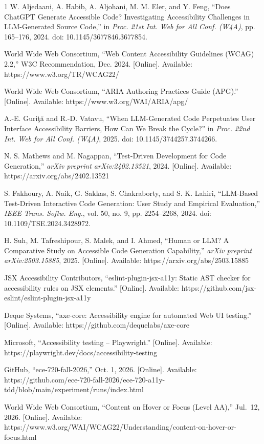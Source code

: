 \documentclass[conference]{IEEEtran}
\begin{document}
\begin{thebibliography}{1}
W. Aljedaani, A. Habib, A. Aljohani, M. M. Eler,
and Y. Feng,
``Does ChatGPT Generate Accessible Code?
Investigating Accessibility Challenges in
LLM-Generated Source Code,''
in \emph{Proc. 21st Int. Web for All Conf. (W4A)},
pp. 165--176, 2024.
doi: 10.1145/3677846.3677854.

World Wide Web Consortium,
``Web Content Accessibility Guidelines (WCAG) 2.2,''
W3C Recommendation, Dec. 2024.
[Online]. Available:
https://www.w3.org/TR/WCAG22/

World Wide Web Consortium,
``ARIA Authoring Practices Guide (APG).''
[Online]. Available:
https://www.w3.org/WAI/ARIA/apg/

A.-E. Guri{\c{t}}{\u{a}} and R.-D. Vatavu,
``When LLM-Generated Code Perpetuates User
Interface Accessibility Barriers, How Can We
Break the Cycle?''
in \emph{Proc. 22nd Int. Web for All Conf. (W4A)},
2025.
doi: 10.1145/3744257.3744266.

N. S. Mathews and M. Nagappan,
``Test-Driven Development for Code Generation,''
\emph{arXiv preprint arXiv:2402.13521}, 2024.
[Online]. Available:
https://arxiv.org/abs/2402.13521

S. Fakhoury, A. Naik, G. Sakkas,
S. Chakraborty, and S. K. Lahiri,
``LLM-Based Test-Driven Interactive Code
Generation: User Study and Empirical Evaluation,''
\emph{IEEE Trans. Softw. Eng.},
vol. 50, no. 9, pp. 2254--2268, 2024.
doi: 10.1109/TSE.2024.3428972.

H. Suh, M. Tafreshipour, S. Malek, and I. Ahmed,
``Human or LLM? A Comparative Study on
Accessible Code Generation Capability,''
\emph{arXiv preprint arXiv:2503.15885}, 2025.
[Online]. Available:
https://arxiv.org/abs/2503.15885

JSX Accessibility Contributors,
``eslint-plugin-jsx-a11y: Static AST checker
for accessibility rules on JSX elements.''
[Online]. Available:
https://github.com/jsx-eslint/eslint-plugin-jsx-a11y

Deque Systems,
``axe-core: Accessibility engine for automated
Web UI testing.''
[Online]. Available:
https://github.com/dequelabs/axe-core

Microsoft,
``Accessibility testing -- Playwright.''
[Online]. Available:
https://playwright.dev/docs/accessibility-testing

  GitHub, ``ece-720-fall-2026,'' Oct. 1, 2026. [Online]. Available: https://github.com/ece-720-fall-2026/ece-720-a11y-tdd/blob/main/experiment/runs/index.html

  World Wide Web Consortium, ``Content on Hover or Focus (Level AA),'' Jul.\ 12, 2026. [Online]. Available: https://www.w3.org/WAI/WCAG22/Understanding/content-on-hover-or-focus.html
\end{thebibliography}  
\end{document}
